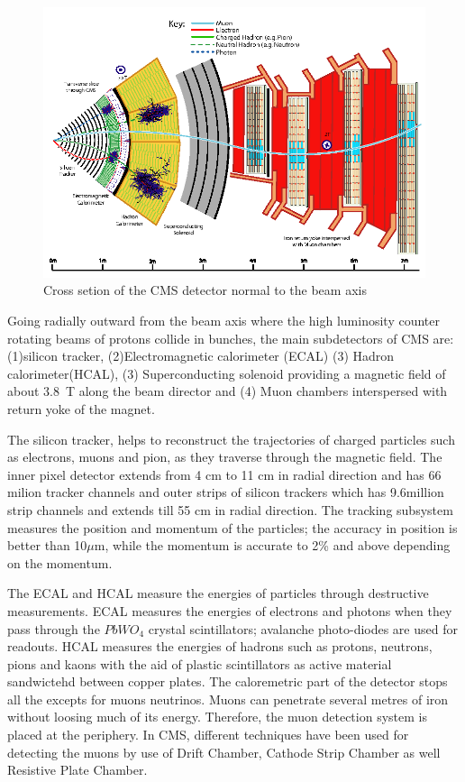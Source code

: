 \documentclass[12pt,a4paper]{article}		%
\begin{document}
\begin{figure}[h]
	\includegraphics[scale=0.6]{cms.png} 
	\caption{Cross setion of the CMS detector normal to the beam axis}
   \label{fig:CMS}
	\centering	
\end{figure}


Going radially outward from the beam axis where the high luminosity counter rotating beams of protons collide in bunches, the main subdetectors of CMS  are: (1)silicon tracker, (2)Electromagnetic calorimeter (ECAL) (3) Hadron calorimeter(HCAL), (3) Superconducting solenoid providing a magnetic field of about 3.8~T along the beam director and (4) Muon chambers interspersed with return yoke of the magnet. 

The silicon tracker, helps to reconstruct the trajectories of charged particles such as electrons, muons and pion, as they traverse through the magnetic field.  The inner pixel detector extends from 4 cm to 11 cm in radial direction and has 66 milion tracker channels and outer strips of silicon trackers which has 9.6million strip channels and extends till 55 cm in radial direction. The tracking subsystem measures the  position and momentum of the particles; the accuracy in position is better than 10$\mu$m, while the momentum is accurate to 2\% and above depending on the momentum. 

The ECAL and HCAL measure the energies of particles through destructive measurements. ECAL measures the energies of electrons and photons when they pass through the $PbWO_4$ crystal scintillators; avalanche photo-diodes are used for readouts. HCAL measures the energies of hadrons such as protons, neutrons, pions and kaons with the aid of plastic scintillators as active material sandwictehd between copper plates. The caloremetric part of the detector stops all the  excepts for muons neutrinos. Muons can penetrate several metres of iron without loosing much of its energy. Therefore, the muon detection system is placed at the periphery. In CMS, different techniques have been used for detecting the muons by use of Drift Chamber, Cathode Strip Chamber as well Resistive Plate Chamber.
\end{document}
